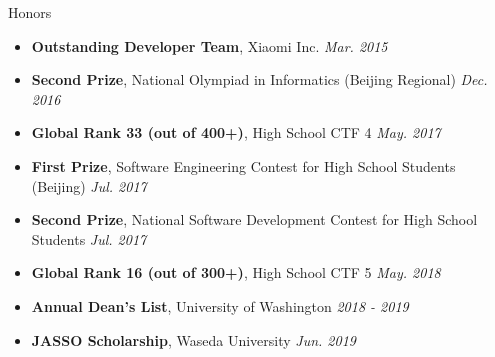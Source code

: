 \documentclass{resume}
\begin{document}

	\begin{rSection}{Honors}
		\begin{itemize}
			\setlength{\itemsep}{1pt}
			\setlength{\parskip}{0pt}
			\setlength{\parsep}{0pt}
			\item \textbf{Outstanding Developer Team}, Xiaomi Inc. \hfill {\em Mar. 2015}
			\item \textbf{Second Prize}, National Olympiad in Informatics (Beijing Regional) \hfill {\em Dec. 2016}
			\item \textbf{Global Rank 33 (out of 400+)}, High School CTF 4 \hfill {\em May. 2017}
			\item \textbf{First Prize}, Software Engineering Contest for High School Students (Beijing) \hfill {\em Jul. 2017}
			\item \textbf{Second Prize}, National Software Development Contest for High School Students \hfill {\em Jul. 2017}
			\item \textbf{Global Rank 16 (out of 300+)}, High School CTF 5 \hfill {\em May. 2018}
			\item \textbf{Annual Dean's List}, University of Washington \hfill {\em 2018 - 2019}
			\item \textbf{JASSO Scholarship}, Waseda University \hfill {\em Jun. 2019}
		\end{itemize}
	\end{rSection}
\end{document}
